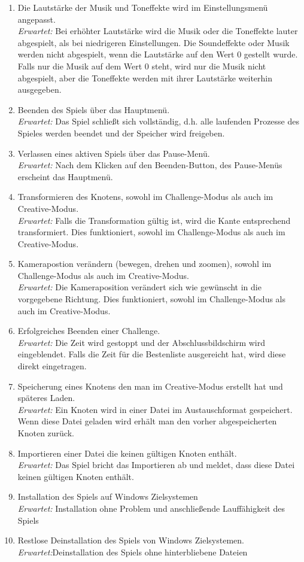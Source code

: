 \begin{enumerate}
\item Die Lautstärke der Musik und Toneffekte wird im Einstellungsmenü angepasst. \\  
\textit{Erwartet:} Bei erhöhter Lautstärke wird die Musik oder die Toneffekte lauter abgespielt, als bei niedrigeren Einstellungen. Die Soundeffekte oder Musik werden nicht abgespielt, wenn die Lautstärke auf den Wert 0 gestellt wurde. Falls nur die Musik auf dem Wert 0 steht, wird nur die Musik nicht abgespielt, aber die Toneffekte werden mit ihrer Lautstärke weiterhin ausgegeben.
\item Beenden des Spiels über das Hauptmenü.\\
\textit{Erwartet:} Das Spiel schließt sich vollständig, d.h. alle laufenden Prozesse des Spieles werden beendet und der Speicher wird freigeben.
\item Verlassen eines aktiven Spiels über das Pause-Menü.\\
\textit{Erwartet:} Nach dem Klicken auf den Beenden-Button, des Pause-Menüs erscheint das Hauptmenü.
\item Transformieren des Knotens, sowohl im Challenge-Modus als auch im Creative-Modus.\\
\textit{Erwartet:} Falls die Transformation gültig ist, wird die Kante entsprechend transformiert. Dies funktioniert, sowohl im Challenge-Modus als auch im Creative-Modus.
\item Kamerapostion verändern (bewegen, drehen und zoomen), sowohl im Challenge-Modus als auch im Creative-Modus.\\
\textit{Erwartet:} Die Kameraposition verändert sich wie gewünscht in die vorgegebene Richtung. Dies funktioniert, sowohl im Challenge-Modus als auch im Creative-Modus.
\item Erfolgreiches Beenden einer Challenge. \\
\textit{Erwartet:} Die Zeit wird gestoppt und der Abschlussbildschirm wird eingeblendet. Falls die Zeit für die Bestenliste ausgereicht hat, wird diese direkt eingetragen.
\item Speicherung eines Knotens den man im Creative-Modus erstellt hat und späteres Laden.\\
\textit{Erwartet:} Ein Knoten wird in einer Datei im Austauschformat gespeichert. Wenn diese Datei geladen wird erhält man den vorher abgespeicherten Knoten zurück.
\item Importieren einer Datei die keinen gültigen Knoten enthält.\\
\textit{Erwartet:} Das Spiel bricht das Importieren ab und meldet, dass diese Datei keinen gültigen Knoten enthält.
\item Installation des Spiels auf Windows Zielsystemen\\
\textit{Erwartet:} Installation ohne Problem und anschließende Lauffähigkeit des Spiels
\item Restlose Deinstallation des Spiels von Windows Zielsystemen.\\
\textit{Erwartet:}Deinstallation des Spiels ohne hinterbliebene Dateien

\end{enumerate}


